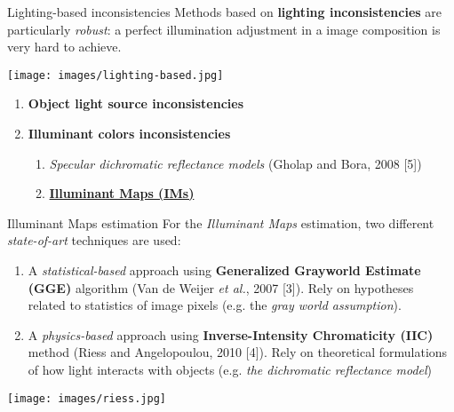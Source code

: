 
\begin{tframe}{Lighting-based inconsistencies}
Methods based on \textbf{lighting inconsistencies} are particularly \emph{robust}: a perfect illumination adjustment in a image composition is very hard to achieve.
\begin{center}
\texttt{[image: images/lighting-based.jpg]}
\end{center}
\begin{enumerate}
\item \textbf{Object light source inconsistencies}
\vspace{0.1cm}
\item \textbf{Illuminant colors inconsistencies}
\vspace{0.1cm}
\begin{enumerate}
\item \textit{Specular dichromatic reflectance models} {\tiny (Gholap and Bora, 2008 [5])}
\vspace{0.1cm}
\item \textbf{\uline{Illuminant Maps (IMs)}}
\end{enumerate}
\end{enumerate}
\vspace{0.3cm}
\end{tframe}


\begin{tframe}{Illuminant Maps estimation}
\vspace{0.2cm}
For the \emph{Illuminant Maps} estimation, two different \emph{state-of-art} techniques are used: 
\vspace{0.3cm}
\begin{small}
\begin{enumerate}
\item A \emph{statistical-based} approach using \textbf{Generalized Grayworld Estimate (GGE)} algorithm {\tiny (Van de Weijer \emph{et al.}, 2007 [3])}. Rely on hypotheses related to statistics of image pixels (e.g.  the \emph{gray world assumption}).
\vspace{0.2cm}
\item A \emph{physics-based} approach using \textbf{Inverse-Intensity Chromaticity (IIC)} method {\tiny (Riess and Angelopoulou, 2010 [4])}. Rely on theoretical formulations of how light interacts with objects (e.g. \emph{the dichromatic reflectance model})
\end{enumerate}
\end{small}

\begin{center}
\texttt{[image: images/riess.jpg]}
\end{center}

\end{tframe}

